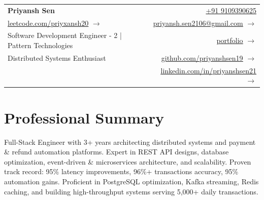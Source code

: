 \documentclass[a4paper,11pt]{article}
\makeatletter
\newcommand{\name}{Priyansh Sen} %
\newcommand{\emaila}{priyansh.sen2106@gmail.com} %
\makeatother
\begin{document}
\selectfont
{ 
\begin{tabularx}{\linewidth}{L r} \\
  \textbf{\huge \name} & \href{tel:+919109390625}{+91 9109390625}\\
  {\href{https://www.leetcode.com/priyxansh20}{\underline{leetcode.com/priyxansh20}}} {\small $\rightarrow$} & \href{mailto:\emaila}{\underline{priyansh.sen2106@gmail.com}} {\small $\rightarrow$} \\
  Software Development Engineer - 2 | Pattern Technologies & \href{https://priyansh-portfolio-phi.vercel.app}{\underline{portfolio}} {\small $\rightarrow$}\\
  Distributed Systems Enthusiast & \href{https://github.com/priyanshsen19}{\underline{github.com/priyanshsen19}} {\small $\rightarrow$} \\  
  {} & \href{https://www.linkedin.com/in/priyanshsen21/}{\underline{linkedin.com/in/priyanshsen21}} {\small $\rightarrow$}
\end{tabularx}
 \vspace{-22.5pt}
}
\section{\textbf{Professional Summary}}
\vspace{2pt}
\small{Full-Stack Engineer with 3+ years architecting distributed systems and payment \& refund automation platforms. Expert in REST API designs, database optimization, event-driven \& microservices architecture, and scalability. Proven track record: 95\% latency improvements, 96\%+ transactions accuracy, 95\% automation gains. Proficient in PostgreSQL optimization, Kafka streaming, Redis caching, and building high-throughput systems serving 5,000+ daily transactions.}
\vspace{-10pt}


\end{document}
